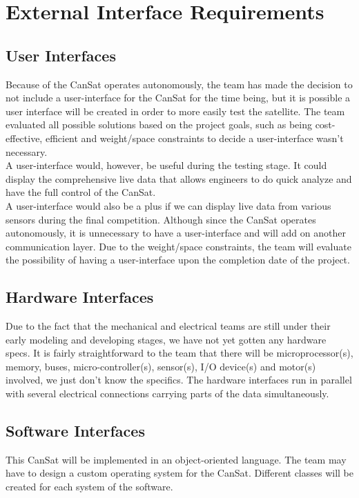 \documentclass{scrreprt}
\begin{document}
\chapter{External Interface Requirements}

\section{User Interfaces}
Because of the CanSat operates autonomously, the team has made the decision to not include a user-interface for the CanSat for the time being, but it is possible a user interface will be created in order to more easily test the satellite. The team evaluated all possible solutions based on the project goals, such as being cost-effective, efficient and weight/space constraints to decide a user-interface wasn't necessary.\\
A user-interface would, however, be useful during the testing stage. It could display the comprehensive live data that allows engineers to do quick analyze and have the full control of the CanSat. \\
A user-interface would also be a plus if we can display live data from various sensors during the final competition. Although since the CanSat operates autonomously, it is unnecessary to have a user-interface and will add on another communication layer. Due to the weight/space constraints, the team will evaluate the possibility of having a user-interface upon the completion date of the project.

\section{Hardware Interfaces}
Due to the fact that the mechanical and electrical teams are still under their early modeling and developing stages, we have not yet gotten any hardware specs. It is fairly straightforward to the team that there will be microprocessor(s), memory, buses, micro-controller(s), sensor(s), I/O device(s) and motor(s) involved, we just don't know the specifics. The hardware interfaces run in parallel with several electrical connections carrying parts of the data simultaneously.

\section{Software Interfaces}
This CanSat will be implemented in an object-oriented language. The team may have to design a custom operating system for the CanSat. Different classes will be created for each system of the software.
\end{document}
